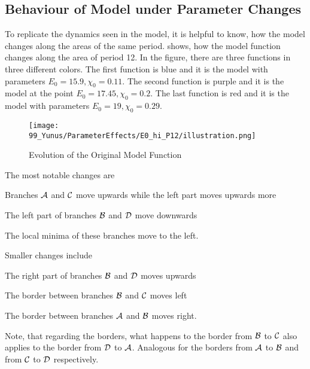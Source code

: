 \subsection{Behaviour of Model under Parameter Changes}

To replicate the dynamics seen in the model, it is helpful to know, how the model changes along the areas of the same period.
 shows, how the model function changes along the area of period 12.
In the figure, there are three functions in three different colors.
The first function is blue and it is the model with parameters $E_0 = 15.9, \chi_0 = 0.11$.
The second function is purple and it is the model at the point $E_0 = 17.45, \chi_0 = 0.2$.
The last function is red and it is the model with parameters $E_0 = 19, \chi_0 = 0.29$.

\begin{figure}
    \centering
    \texttt{[image: 99\_Yunus/ParameterEffects/E0\_hi\_P12/illustration.png]}
    \caption{Evolution of the Original Model Function}
    \label{fig:yunus.function.evolution}
\end{figure}

The most notable changes are
\begin{enumerate*}
    \item Branches $\mathcal{A}$ and $\mathcal{C}$ move upwards while the left part moves upwards more
    \item The left part of branches $\mathcal{B}$ and $\mathcal{D}$ move downwards 
    \item The local minima of these branches move to the left.
\end{enumerate*}
Smaller changes include
\begin{enumerate*}
    \item The right part of branches $\mathcal{B}$ and $\mathcal{D}$ moves upwards
    \item The border between branches $\mathcal{B}$ and $\mathcal{C}$ moves left
    \item The border between branches $\mathcal{A}$ and $\mathcal{B}$ moves right.
\end{enumerate*}
Note, that regarding the borders, what happens to the border from $\mathcal{B}$ to $\mathcal{C}$ also applies to the border from $\mathcal{D}$ to $\mathcal{A}$.
Analogous for the borders from $\mathcal{A}$ to $\mathcal{B}$ and from $\mathcal{C}$ to $\mathcal{D}$ respectively.
